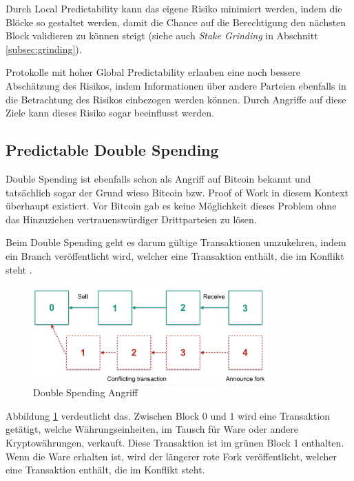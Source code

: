 Durch Local Predictability kann das eigene Risiko minimiert werden, indem die Blöcke so gestaltet werden, damit die Chance auf die Berechtigung den nächsten Block validieren zu können steigt (siehe auch \textit{Stake Grinding} in Abschnitt \ref{subsec:grinding}).

Protokolle mit hoher Global Predictability erlauben eine noch bessere Abschätzung des Risikos, indem Informationen über andere Parteien ebenfalls in die Betrachtung des Risikos einbezogen werden können. Durch Angriffe auf diese Ziele kann dieses Risiko sogar beeinflusst werden.

\subsection{Predictable Double Spending}
\label{subsec:doublespending}

Double Spending ist ebenfalls schon als Angriff auf Bitcoin bekannt und tatsächlich sogar der Grund wieso Bitcoin bzw. Proof of Work in diesem Kontext überhaupt existiert. Vor Bitcoin gab es keine Möglichkeit dieses Problem ohne das Hinzuziehen vertrauenswürdiger Drittparteien zu lösen. 

Beim Double Spending geht es darum gültige Transaktionen umzukehren, indem ein Branch veröffentlicht wird, welcher eine Transaktion enthält, die im Konflikt steht \cite[S. 45]{ouroboros}.

\begin{figure}[htb] 
	\centerline{\includegraphics*[width=0.8\textwidth]{img/double_spending}}
\caption{Double Spending Angriff}
\label{fig:double_spending}
\end{figure}

Abbildung \ref{fig:double_spending} verdeutlicht das. Zwischen Block 0 und 1 wird eine Transaktion getätigt, welche Währungseinheiten, im Tausch für Ware oder andere Kryptowährungen, verkauft. Diese Transaktion ist im grünen Block 1 enthalten.
Wenn die Ware erhalten ist, wird der längerer rote Fork veröffentlicht, welcher eine Transaktion enthält, die im Konflikt steht.

